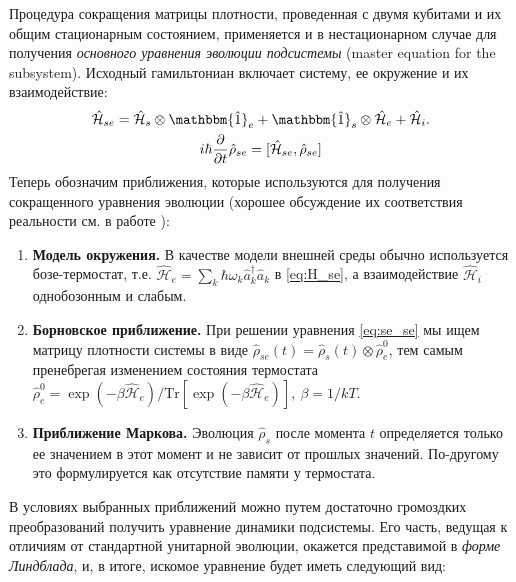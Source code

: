 \documentclass[12pt, twoside]{report}
\newcommand{\Tr}[1]{\text{Tr}\left[#1\right]}
\newcommand{\rbrkt}[1]{\left( #1 \right)}
\numberwithin{equation}{section}
\numberwithin{figure}{section}
\begin{document}
Процедура сокращения матрицы плотности, проведенная с двумя кубитами и их общим стационарным состоянием, применяется и в нестационарном случае для получения \textit{основного уравнения эволюции подсистемы} (master equation for the subsystem)\cite{carmichael1999}. Исходный гамильтониан включает систему, ее окружение и их взаимодействие:
\begin{gather}
\mathcal{\hat H}_{se} = \mathcal{\hat H}_s \otimes \mathbbm{\hat 1}_e + \mathbbm{\hat 1}_s \otimes \mathcal{\hat H}_e + \mathcal{\hat H}_i. 
\label{eq:H_se}
\\
i\hbar \frac{\partial}{\partial t} \hat \rho_{se} = [\mathcal{\hat H}_{se}, \hat \rho_{se}]
\label{eq:se_se}
\end{gather}
Теперь обозначим приближения, которые используются для получения сокращенного уравнения эволюции (хорошее обсуждение их соответствия реальности см. в работе \cite{rivas2010}):
\begin{enumerate}
\item \textbf{Модель окружения.} В качестве модели внешней среды обычно используется бозе-термостат, т.е. $  \mathcal{\hat H}_e = \sum_k \hbar \omega_k \hat a_k^\dag \hat a_k$ в \eqref{eq:H_se}, а взаимодействие $\mathcal{\hat H}_i$ однобозонным и слабым.
\item \textbf{Борновское приближение.} При решении уравнения \eqref{eq:se_se} мы ищем матрицу плотности системы в виде $\hat \rho_{se}(t) = \hat \rho_{s}(t) \otimes \hat \rho_{e}^0$, тем самым пренебрегая изменением состояния термостата $\displaystyle \hat \rho_{e}^0 = \exp\rbrkt{-\beta \mathcal{\hat H}_{e}}/\Tr{\exp\rbrkt{-\beta \mathcal{\hat H}_e}},\ \beta = 1/kT$.
\item \textbf{Приближение Маркова.} Эволюция $\hat \rho_{s}$ после момента $t$ определяется только ее значением в этот момент и не зависит от прошлых значений. По-другому это формулируется как отсутствие памяти у термостата. 
\end{enumerate}
В условиях выбранных приближений можно путем достаточно громоздких преобразований получить уравнение динамики подсистемы. Его часть, ведущая к отличиям от стандартной унитарной эволюции, окажется представимой в \textit{форме Линдблада}, и, в итоге, искомое уравнение будет иметь следующий вид:
\end{document}
